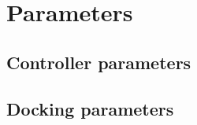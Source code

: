 \section{Parameters}

\readonlynote



\subsection{Controller parameters}



\subsection{Docking parameters}



